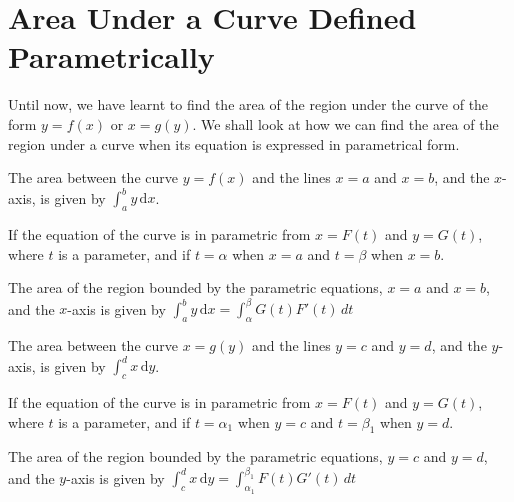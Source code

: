 \documentclass[11pt,a4paper]{book}
\begin{document}
\newpage

\section{Area Under a Curve Defined Parametrically}

Until now, we have learnt to find the area of the region under the
curve of the form $y=f(x)$ or $x=g(y)$. We shall look at how we
can find the area of the region under a curve when its equation is
expressed in parametrical form.

\begin{tcolorbox}[colback=blue!5, colframe=black, boxrule=.4pt, sharpish corners]
The area between the curve $y=f(x)$ and the lines $x=a$ and $x=b$, and the $x$-axis, is given by ${\displaystyle \int_{a}^{b}y\,\mathrm{d}x}$.

If the equation of the curve is in parametric from $x=F(t)$ and $y=G(t)$, where $t$ is a parameter, and if $t=\alpha$ when $x=a$ and $t=\beta$ when $x=b$.

The area of the region bounded by the parametric equations, $x=a$ and $x=b$, and the $x$-axis is given by ${\displaystyle \int_{a}^{b}y\,\mathrm{d}x=\int_{\alpha}^{\beta}G(t)F'(t)\,dt}$

The area between the curve $x=g(y)$ and the lines $y=c$ and $y=d$, and the $y$-axis, is given by ${\displaystyle \int_{c}^{d}x\,\mathrm{d}y}$.

If the equation of the curve is in parametric from $x=F(t)$ and $y=G(t)$, where $t$ is a parameter, and if $t=\alpha_{1}$ when $y=c$ and $t=\beta_{1}$ when $y=d$.

The area of the region bounded by the parametric equations, $y=c$ and $y=d$, and the $y$-axis is given by ${\displaystyle \int_{c}^{d}x\,\mathrm{d}y=\int_{\alpha_{1}}^{\beta_{1}}F(t)G'(t)\,dt}$%
\end{tcolorbox}
\end{document}

